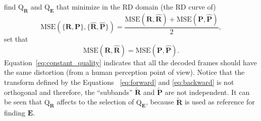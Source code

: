 \begin{comment}
\begin{equation}
  \begin{bmatrix}
    \tilde{\mathbf R} \\
    \tilde{\mathbf E}
  \end{bmatrix} =
  \begin{bmatrix}
    \text{Q}_{\mathbf R}(\cdot) & 0 \\
    -\overset{{\mathbf R}\rightarrow {\mathbf P}}{\text{ME}}(\text{Q}_{\mathbf E}(\cdot)) & 1
  \end{bmatrix}
  \begin{bmatrix}
    {\mathbf R } \\
    {\mathbf P}
  \end{bmatrix}
  \label{eq:forward}
\end{equation}
and
\begin{equation}
  \begin{bmatrix}
    \tilde{\mathbf R} \\
    \tilde{\mathbf P}
  \end{bmatrix} =
  \begin{bmatrix}
    \text{Q}^{-1}_{\mathbf R}(\cdot) & 0 \\
    \overset{{\mathbf R}\rightarrow {\mathbf P}}{\text{ME}}(\text{Q}^{-1}_{\mathbf E}(\cdot)) & 1
  \end{bmatrix}
  \begin{bmatrix}
    \tilde{\mathbf R} \\
    \tilde{\mathbf E},
  \end{bmatrix}
  \label{eq:backward}
\end{equation}
\end{comment}
find $\text{Q}_{\mathbf{R}}$ and $\text{Q}_{\mathbf{E}}$ that minimize in the RD domain (the RD curve of)
\begin{equation}
  \text{MSE}(\{\mathbf{R},\mathbf{P}\},\{\hat{\mathbf{R}},\hat{\mathbf{P}}\}) = \frac{\text{MSE}({\mathbf R},\hat{\mathbf R}) + \text{MSE}({\mathbf P},\hat{\mathbf P})}{2},
\end{equation}
set that
\begin{equation}
  \text{MSE}({\mathbf R},\hat{\mathbf R}) = \text{MSE}({\mathbf P},\hat{\mathbf P}).
  \label{eq:constant_quality}
\end{equation}
Equation~\ref{eq:constant_quality} indicates that all the decoded
frames should have the same distortion (from a human perception point
of view). Notice that the transform defined by the Equations
~\ref{eq:forward} and \ref{eq:backward} is not orthogonal and
therefore, the ``subbands'' $\tilde{\mathbf R}$ and
$\tilde{\mathbf P}$ are not independent. It can be seen that
$\text{Q}_{\mathbf R}$ affects to the selection of
$\text{Q}_{\mathbf E}$, because $\tilde{\mathbf R}$ is used as
reference for finding ${\mathbf E}$.

